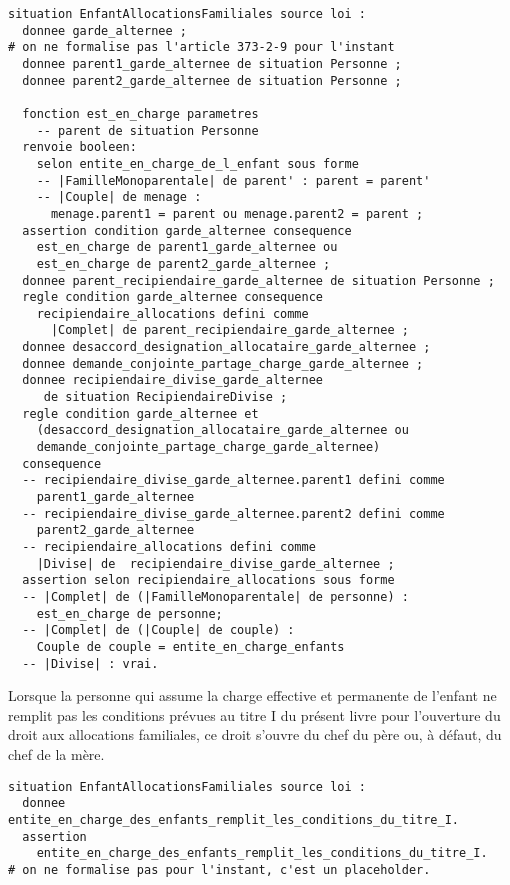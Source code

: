 \documentclass[11pt, french]{article}
\begin{document}
\begin{lstlisting}
situation EnfantAllocationsFamiliales source loi :
  donnee garde_alternee ;
# on ne formalise pas l'article 373-2-9 pour l'instant
  donnee parent1_garde_alternee de situation Personne ;
  donnee parent2_garde_alternee de situation Personne ;

  fonction est_en_charge parametres
    -- parent de situation Personne
  renvoie booleen:
    selon entite_en_charge_de_l_enfant sous forme
    -- |FamilleMonoparentale| de parent' : parent = parent'
    -- |Couple| de menage :
      menage.parent1 = parent ou menage.parent2 = parent ;
  assertion condition garde_alternee consequence
    est_en_charge de parent1_garde_alternee ou
    est_en_charge de parent2_garde_alternee ;
  donnee parent_recipiendaire_garde_alternee de situation Personne ;
  regle condition garde_alternee consequence
    recipiendaire_allocations defini comme
      |Complet| de parent_recipiendaire_garde_alternee ;
  donnee desaccord_designation_allocataire_garde_alternee ;
  donnee demande_conjointe_partage_charge_garde_alternee ;
  donnee recipiendaire_divise_garde_alternee
     de situation RecipiendaireDivise ;
  regle condition garde_alternee et
    (desaccord_designation_allocataire_garde_alternee ou
    demande_conjointe_partage_charge_garde_alternee)
  consequence
  -- recipiendaire_divise_garde_alternee.parent1 defini comme
    parent1_garde_alternee
  -- recipiendaire_divise_garde_alternee.parent2 defini comme
    parent2_garde_alternee
  -- recipiendaire_allocations defini comme
    |Divise| de  recipiendaire_divise_garde_alternee ;
  assertion selon recipiendaire_allocations sous forme
  -- |Complet| de (|FamilleMonoparentale| de personne) :
    est_en_charge de personne;
  -- |Complet| de (|Couple| de couple) :
    Couple de couple = entite_en_charge_enfants
  -- |Divise| : vrai.
\end{lstlisting}
Lorsque la personne qui assume la charge effective et permanente de l'enfant ne remplit pas les conditions prévues au titre I du présent livre pour l'ouverture du droit aux allocations familiales, ce droit s'ouvre du chef du père ou, à défaut, du chef de la mère.
\begin{lstlisting}
situation EnfantAllocationsFamiliales source loi :
  donnee entite_en_charge_des_enfants_remplit_les_conditions_du_titre_I.
  assertion
    entite_en_charge_des_enfants_remplit_les_conditions_du_titre_I.
# on ne formalise pas pour l'instant, c'est un placeholder.
\end{lstlisting}
\end{document}
